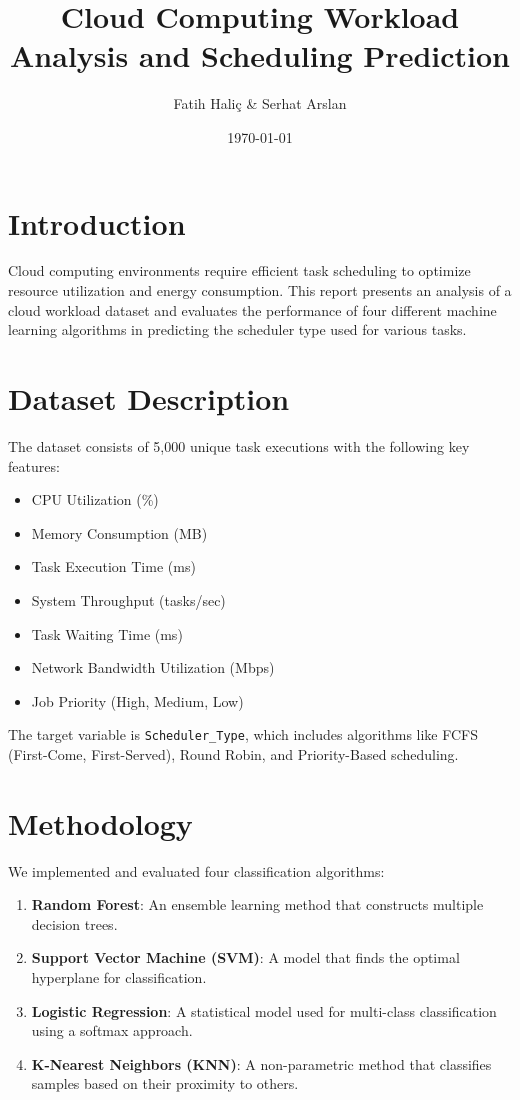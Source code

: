 \documentclass{article}
\title{Cloud Computing Workload Analysis and Scheduling Prediction}
\author{Fatih Hali\c{c} \& Serhat Arslan}
\date{\today}
\begin{document}
\maketitle

\section{Introduction}
Cloud computing environments require efficient task scheduling to optimize resource utilization and energy consumption. This report presents an analysis of a cloud workload dataset and evaluates the performance of four different machine learning algorithms in predicting the scheduler type used for various tasks.

\section{Dataset Description}
The dataset consists of 5,000 unique task executions with the following key features:
\begin{itemize}
    \item CPU Utilization (\%)
    \item Memory Consumption (MB)
    \item Task Execution Time (ms)
    \item System Throughput (tasks/sec)
    \item Task Waiting Time (ms)
    \item Network Bandwidth Utilization (Mbps)
    \item Job Priority (High, Medium, Low)
\end{itemize}
The target variable is \texttt{Scheduler\_Type}, which includes algorithms like FCFS (First-Come, First-Served), Round Robin, and Priority-Based scheduling.

\section{Methodology}
We implemented and evaluated four classification algorithms:
\begin{enumerate}
    \item \textbf{Random Forest}: An ensemble learning method that constructs multiple decision trees.
    \item \textbf{Support Vector Machine (SVM)}: A model that finds the optimal hyperplane for classification.
    \item \textbf{Logistic Regression}: A statistical model used for multi-class classification using a softmax approach.
    \item \textbf{K-Nearest Neighbors (KNN)}: A non-parametric method that classifies samples based on their proximity to others.
\end{enumerate}
\end{document}
